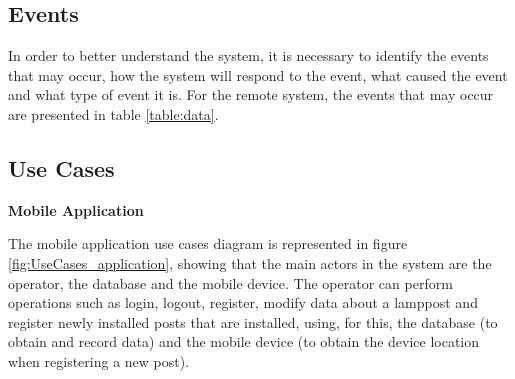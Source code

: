 \subsection{Events}
In order to better understand the system, it is necessary to identify the events that may occur, how the system will respond to the event, what caused the event and what type of event it is. For the remote system, the events that may occur are presented in table \ref{table:data}.

\begin{table}[ht]
	\centering
		
	\caption{Remote system events.}
	\label{table:data}
\end{table}


\subsection{Use Cases}
\textbf{Mobile Application}

The mobile application use cases diagram is represented in figure \ref{fig:UseCases_application}, showing that the main actors in the system are the operator, the database and the mobile device. The operator can perform operations such as login, logout, register, modify data about a lamppost and register newly installed posts that are installed, using, for this, the database (to obtain and record data) and the mobile device (to obtain the device location when registering a new post).

